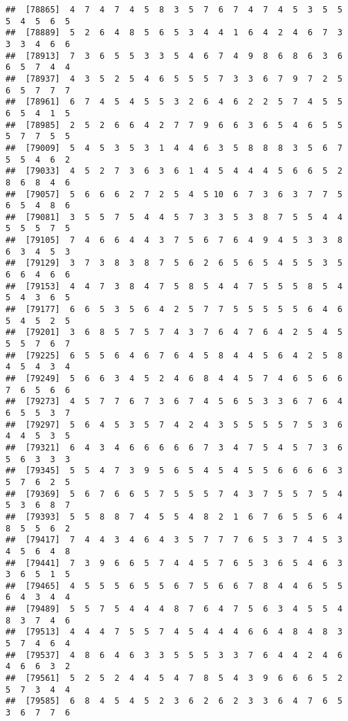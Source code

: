 \documentclass[
]{book}
\begin{document}
\begin{verbatim}
##  [78865]  4  7  4  7  4  5  8  3  5  7  6  7  4  7  4  5  3  5  5  5  4  5  6  5
##  [78889]  5  2  6  4  8  5  6  5  3  4  4  1  6  4  2  4  6  7  3  3  3  4  6  6
##  [78913]  7  3  6  5  5  3  3  5  4  6  7  4  9  8  6  8  6  3  6  6  5  7  4  4
##  [78937]  4  3  5  2  5  4  6  5  5  5  7  3  3  6  7  9  7  2  5  6  5  7  7  7
##  [78961]  6  7  4  5  4  5  5  3  2  6  4  6  2  2  5  7  4  5  5  6  5  4  1  5
##  [78985]  2  5  2  6  6  4  2  7  7  9  6  6  3  6  5  4  6  5  5  5  7  7  5  5
##  [79009]  5  4  5  3  5  3  1  4  4  6  3  5  8  8  8  3  5  6  7  5  5  4  6  2
##  [79033]  4  5  2  7  3  6  3  6  1  4  5  4  4  4  5  6  6  5  2  8  6  8  4  6
##  [79057]  5  6  6  6  2  7  2  5  4  5 10  6  7  3  6  3  7  7  5  6  5  4  8  6
##  [79081]  3  5  5  7  5  4  4  5  7  3  3  5  3  8  7  5  5  4  4  5  5  5  7  5
##  [79105]  7  4  6  6  4  4  3  7  5  6  7  6  4  9  4  5  3  3  8  6  3  4  5  3
##  [79129]  3  7  3  8  3  8  7  5  6  2  6  5  6  5  4  5  5  3  5  6  6  4  6  6
##  [79153]  4  4  7  3  8  4  7  5  8  5  4  4  7  5  5  5  8  5  4  5  4  3  6  5
##  [79177]  6  6  5  3  5  6  4  2  5  7  7  5  5  5  5  5  6  4  6  5  4  5  2  5
##  [79201]  3  6  8  5  7  5  7  4  3  7  6  4  7  6  4  2  5  4  5  5  5  7  6  7
##  [79225]  6  5  5  6  4  6  7  6  4  5  8  4  4  5  6  4  2  5  8  4  5  4  3  4
##  [79249]  5  6  6  3  4  5  2  4  6  8  4  4  5  7  4  6  5  6  6  7  6  5  6  6
##  [79273]  4  5  7  7  6  7  3  6  7  4  5  6  5  3  3  6  7  6  4  6  5  5  3  7
##  [79297]  5  6  4  5  3  5  7  4  2  4  3  5  5  5  5  7  5  3  6  4  4  5  3  5
##  [79321]  6  4  3  4  6  6  6  6  6  7  3  4  7  5  4  5  7  3  6  5  6  3  3  3
##  [79345]  5  5  4  7  3  9  5  6  5  4  5  4  5  5  6  6  6  6  3  5  7  6  2  5
##  [79369]  5  6  7  6  6  5  7  5  5  5  7  4  3  7  5  5  7  5  4  5  3  6  8  7
##  [79393]  5  5  8  8  7  4  5  5  4  8  2  1  6  7  6  5  5  6  4  8  5  5  6  2
##  [79417]  7  4  4  3  4  6  4  3  5  7  7  7  6  5  3  7  4  5  3  4  5  6  4  8
##  [79441]  7  3  9  6  6  5  7  4  4  5  7  6  5  3  6  5  4  6  3  3  6  5  1  5
##  [79465]  4  5  5  5  6  5  5  6  7  5  6  6  7  8  4  4  6  5  5  6  4  3  4  4
##  [79489]  5  5  7  5  4  4  4  8  7  6  4  7  5  6  3  4  5  5  4  8  3  7  4  6
##  [79513]  4  4  4  7  5  5  7  4  5  4  4  4  6  6  4  8  4  8  3  5  7  4  6  4
##  [79537]  4  8  6  4  6  3  3  5  5  5  3  3  7  6  4  4  2  4  6  4  6  6  3  2
##  [79561]  5  2  5  2  4  4  5  4  7  8  5  4  3  9  6  6  6  5  2  5  7  3  4  4
##  [79585]  6  8  4  5  4  5  2  3  6  2  6  2  3  3  6  4  7  6  5  3  6  7  7  6

\end{verbatim}
\end{document}
